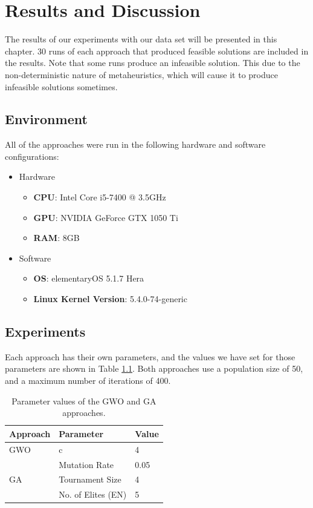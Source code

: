 \chapter{Results and Discussion}
The results of our experiments with our data set will be presented in this chapter. 30 runs of each approach that produced feasible solutions are included in the results. Note that some runs produce an infeasible solution. This due to the non-deterministic nature of metaheuristics, which will cause it to produce infeasible solutions sometimes.

\section{Environment}
All of the approaches were run in the following hardware and software configurations:

\begin{itemize}
	\item Hardware
	\begin{itemize}
		\item \textbf{CPU}: Intel Core i5-7400 @ 3.5GHz
		\item \textbf{GPU}: NVIDIA GeForce GTX 1050 Ti
		\item \textbf{RAM}: 8GB
	\end{itemize}
	\item Software
	\begin{itemize}
		\item \textbf{OS}: elementaryOS 5.1.7 Hera
		\item \textbf{Linux Kernel Version}: 5.4.0-74-generic
	\end{itemize}
\end{itemize}

\section{Experiments}
Each approach has their own parameters, and the values we have set for those parameters are shown in Table \ref{approach-parameters}. Both approaches use a population size of 50, and a maximum number of iterations of 400.

\begin{table}[h!]
	\centering
	\begin{tabular}{|l|l|l|}
		\hline
		\textbf{Approach}   & \textbf{Parameter} & \textbf{Value} \\ \hline
		GWO                 & c                  & 4              \\ \hline
		\multirow{3}{*}{GA} & Mutation Rate      & 0.05           \\ \cline{2-3} 
		& Tournament Size    & 4              \\ \cline{2-3} 
		& No. of Elites (EN) & 5              \\ \hline
	\end{tabular}
	\caption{Parameter values of the GWO and GA approaches.}
	\label{approach-parameters}
\end{table}

